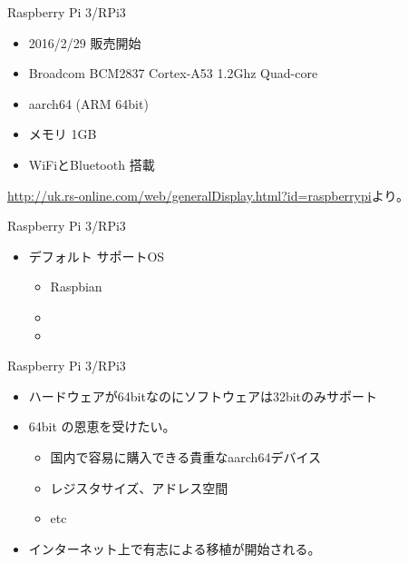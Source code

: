 \begin{frame}{Raspberry Pi 3/RPi3}

\begin{itemize}
\item 2016/2/29 販売開始
\item Broadcom BCM2837 Cortex-A53 1.2Ghz Quad-core
\item aarch64 (ARM 64bit)
\item メモリ 1GB
\item WiFiとBluetooth 搭載
\end{itemize}

\begin{center}
\end{center}
{\tiny \url{http://uk.rs-online.com/web/generalDisplay.html?id=raspberrypi}より。}

\end{frame}

\begin{frame}{Raspberry Pi 3/RPi3}

\begin{itemize}
\item デフォルト サポートOS
\begin{itemize}[<+->]
	\item Raspbian
	\item \color{red}{armhf (浮動小数点演算ハードウェアサポート)}
	\item \color{red}{32bitバイナリ。64bit ではない}
\end{itemize}
\end{itemize}

\end{frame}

\begin{frame}{Raspberry Pi 3/RPi3}

\begin{itemize}
\item ハードウェアが64bitなのにソフトウェアは32bitのみサポート
\item 64bit の恩恵を受けたい。

\begin{itemize}
	\item 国内で容易に購入できる貴重なaarch64デバイス
	\item レジスタサイズ、アドレス空間
	\item etc
\end{itemize}
\item インターネット上で有志による移植が開始される。
\end{itemize}

\end{frame}

